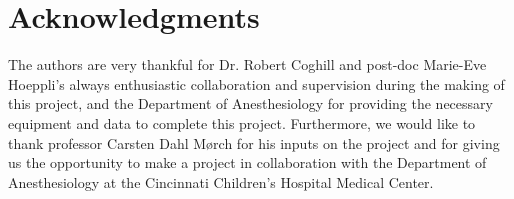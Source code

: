 \chapter*{Acknowledgments}


The authors are very thankful for Dr. Robert Coghill and post-doc Marie-Eve Hoeppli's always enthusiastic collaboration and supervision during the making of this project, and the Department of Anesthesiology for providing the necessary equipment and data to complete this project. Furthermore, we would like to thank professor Carsten Dahl Mørch for his inputs on the project and for giving us the opportunity to make a project in collaboration with the Department of Anesthesiology at the Cincinnati Children's Hospital Medical Center.      